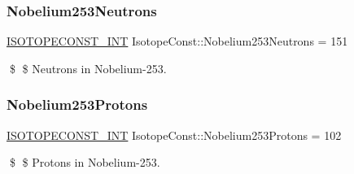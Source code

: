 \subsubsection{\texorpdfstring{Nobelium253\+Neutrons}{Nobelium253Neutrons}}
{\footnotesize\ttfamily \mbox{\hyperlink{group___isotope_const-_macros_ga5f18360b3e99483a35c32d789e62621c}{I\+S\+O\+T\+O\+P\+E\+C\+O\+N\+S\+T\+\_\+\+I\+NT}} Isotope\+Const\+::\+Nobelium253\+Neutrons = 151}

\$ \$ Neutrons in Nobelium-\/253. \mbox{\label{group___isotope_const-_nobelium-_no253_ga9f229c723618e3e06f639960a1375d59}} 
\subsubsection{\texorpdfstring{Nobelium253\+Protons}{Nobelium253Protons}}
{\footnotesize\ttfamily \mbox{\hyperlink{group___isotope_const-_macros_ga5f18360b3e99483a35c32d789e62621c}{I\+S\+O\+T\+O\+P\+E\+C\+O\+N\+S\+T\+\_\+\+I\+NT}} Isotope\+Const\+::\+Nobelium253\+Protons = 102}

\$ \$ Protons in Nobelium-\/253. 